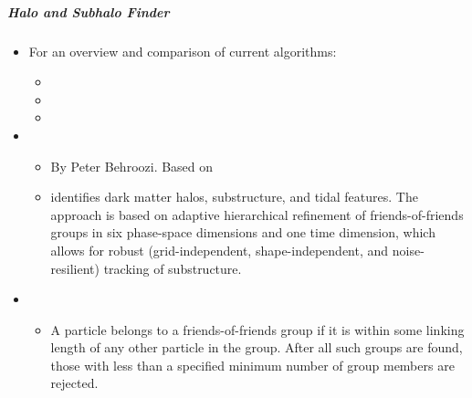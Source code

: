\documentclass[letterpaper,10pt,english]{sphinxmanual}
\begin{document}
\subparagraph{Halo and Subhalo Finder}
\label{\detokenize{resource/astro/topics/simulations:halo-and-subhalo-finder}}\begin{itemize}
\item {} 
For an overview and comparison of current algorithms:
\begin{itemize}
\item {} 

\item {} 

\item {} 

\end{itemize}

\item {} 
\begin{itemize}
\item {} 
By Peter Behroozi. Based on 

\item {} 
 identifies dark matter halos, substructure, and tidal
features. The approach is based on adaptive hierarchical
refinement of friends-of-friends groups in six phase-space
dimensions and one time dimension, which allows for robust
(grid-independent, shape-independent, and noise-resilient)
tracking of substructure.

\end{itemize}

\item {} 
\begin{itemize}
\item {} 
A particle belongs to a friends-of-friends group if it is within
some linking length of any other particle in the group. After all
such groups are found, those with less than a specified minimum
number of group members are rejected.

\end{itemize}

\end{itemize}
\end{document}
